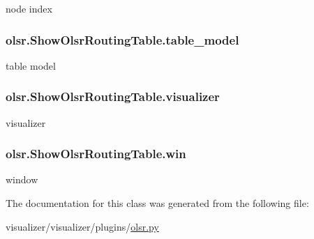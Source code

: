 node index 

\subsubsection[{\texorpdfstring{table\+\_\+model}{table_model}}]{\setlength{\rightskip}{0pt plus 5cm}olsr.\+Show\+Olsr\+Routing\+Table.\+table\+\_\+model}\hypertarget{classolsr_1_1ShowOlsrRoutingTable_a25e5faeb19a0c3ea176550672831e104}{}\label{classolsr_1_1ShowOlsrRoutingTable_a25e5faeb19a0c3ea176550672831e104}


table model 

\subsubsection[{\texorpdfstring{visualizer}{visualizer}}]{\setlength{\rightskip}{0pt plus 5cm}olsr.\+Show\+Olsr\+Routing\+Table.\+visualizer}\hypertarget{classolsr_1_1ShowOlsrRoutingTable_a1ffe99444da97be6a1afe82990d6dd4e}{}\label{classolsr_1_1ShowOlsrRoutingTable_a1ffe99444da97be6a1afe82990d6dd4e}


visualizer 

\subsubsection[{\texorpdfstring{win}{win}}]{\setlength{\rightskip}{0pt plus 5cm}olsr.\+Show\+Olsr\+Routing\+Table.\+win}\hypertarget{classolsr_1_1ShowOlsrRoutingTable_a2939f3f7a402c0356634fd0075b990a8}{}\label{classolsr_1_1ShowOlsrRoutingTable_a2939f3f7a402c0356634fd0075b990a8}


window 



The documentation for this class was generated from the following file\+:\begin{DoxyCompactItemize}
\item 
visualizer/visualizer/plugins/\hyperlink{olsr_8py}{olsr.\+py}\end{DoxyCompactItemize}
